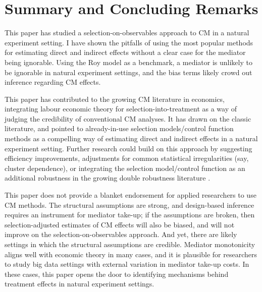 \section{Summary and Concluding Remarks}
\label{sec:conclusion}

This paper has studied a selection-on-observables approach to CM in a natural experiment setting.
I have shown the pitfalls of using the most popular methods for estimating direct and indirect effects without a clear case for the mediator being ignorable.
Using the Roy model as a benchmark, a mediator is unlikely to be ignorable in natural experiment settings, and the bias terms likely crowd out inference regarding CM effects.

This paper has contributed to the growing CM literature in economics, integrating labour economic theory for selection-into-treatment as a way of judging the credibility of conventional CM analyses.
It has drawn on the classic literature, and pointed to already-in-use selection models/control function methods as a compelling way of estimating direct and indirect effects in a natural experiment setting.
Further research could build on this approach by suggesting efficiency improvements, adjustments for common statistical irregularities (say, cluster dependence), or integrating the selection model/control function as an additional robustness in the growing double robustness literature \citep{farbmacher2022causal,bia2024double}.

This paper does not provide a blanket endorsement for applied researchers to use CM methods.
The structural assumptions are strong, and design-based inference requires an instrument for mediator take-up; if the assumptions are broken, then selection-adjusted estimates of CM effects will also be biased, and will not improve on the selection-on-observables approach.
And yet, there are likely settings in which the structural assumptions are credible.
Mediator monotonicity aligns well with economic theory in many cases, and it is plausible for researchers to study big data settings with external variation in mediator take-up costs.
In these cases, this paper opens the door to identifying mechanisms behind treatment effects in natural experiment settings.
